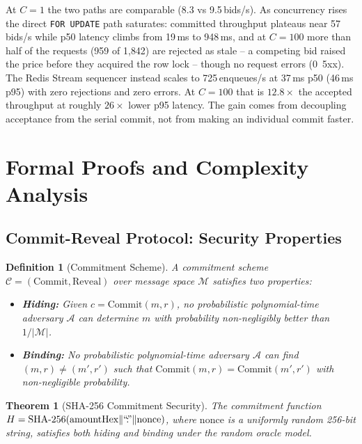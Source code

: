 \documentclass[11pt]{article}
\newtheorem{theorem}{Theorem}
\newtheorem{definition}{Definition}
\begin{document}
At $C=1$ the two paths are comparable (8.3 vs 9.5\,bids/s). As
concurrency rises the direct \texttt{FOR UPDATE} path saturates:
committed throughput plateaus near 57\,bids/s while p50 latency climbs
from 19\,ms to 948\,ms, and at $C=100$ more than half of the requests
(959 of 1{,}842) are rejected as stale -- a competing bid raised the price
before they acquired the row lock -- though no request errors (0~5xx).
The Redis Stream sequencer instead scales to 725\,enqueues/s at 37\,ms
p50 (46\,ms p95) with zero rejections and zero errors. At $C=100$ that is
$12.8\times$ the accepted throughput at roughly $26\times$ lower p95
latency. The gain comes from decoupling acceptance from the serial commit,
not from making an individual commit faster.

\section{Formal Proofs and Complexity Analysis}
\label{sec:proofs}

\subsection{Commit-Reveal Protocol: Security Properties}

\begin{definition}[Commitment Scheme]
A commitment scheme $\mathcal{C} = (\text{Commit}, \text{Reveal})$ over
message space $\mathcal{M}$ satisfies two properties:
\begin{itemize}
    \item \textbf{Hiding:} Given $c = \text{Commit}(m, r)$, no
      probabilistic polynomial-time adversary $\mathcal{A}$ can determine
      $m$ with probability non-negligibly better than $1/|\mathcal{M}|$.
    \item \textbf{Binding:} No probabilistic polynomial-time adversary
      $\mathcal{A}$ can find $(m, r) \neq (m', r')$ such that
      $\text{Commit}(m, r) = \text{Commit}(m', r')$ with non-negligible
      probability.
\end{itemize}
\end{definition}

\begin{theorem}[SHA-256 Commitment Security]
\label{thm:commit}
The commitment function
$H = \text{SHA-256}(\text{amountHex} \| \text{``\!:\!''} \| \text{nonce})$,
where $\text{nonce}$ is a uniformly random 256-bit string, satisfies both
hiding and binding under the random oracle model.
\end{theorem}
\end{document}
